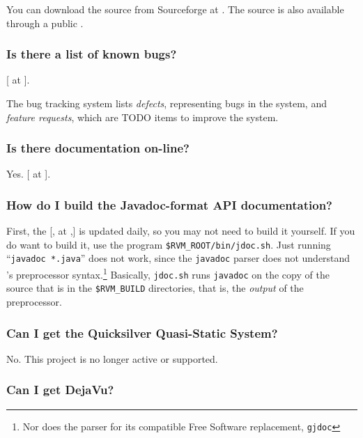You can download the \jrvm{} source from Sourceforge at \xlink{{\tt
\RVMDownloadURL}}{\RVMDownloadURL}.  The \jrvm{} source is also available
through a public .

\subsubsection{Is there a list of known bugs?}

[ at 
{\tt \RVMBugURL}]{\RVMBugURL}.

The bug tracking system lists {\em defects}, representing bugs in the system, and
{\em feature requests}, which are TODO items to improve the system.

\subsubsection{Is there documentation on-line?}

Yes.  [ at
{\tt \RVMHomeURL}]{\RVMHomeURL}.

\subsubsection{How do I build the Javadoc-format API documentation?}%
%

First, the [, at {\tt \RVMJavadocURL},]{%
    \RVMJavadocURL} is updated daily, so you may not need to build it
yourself.  If you do want to build it, use the program
\texttt{\$RVM\_ROOT/bin/jdoc.sh}.   Just running
``\texttt{javadoc *.java}'' does not work, since the \texttt{javadoc}
parser does not understand \jrvm{}'s preprocessor syntax.\footnote{Nor does
the parser for its compatible Free Software replacement,
\texttt{gjdoc}}
Basically, \texttt{jdoc.sh} runs \texttt{javadoc} on the copy of the
source that is in the \texttt{\$RVM\_BUILD} directories, that is, the
{\em output} of the preprocessor. 

\subsubsection{Can I get the Quicksilver Quasi-Static System?}

No. This project is no longer active or supported.

\subsubsection{Can I get DejaVu?}

